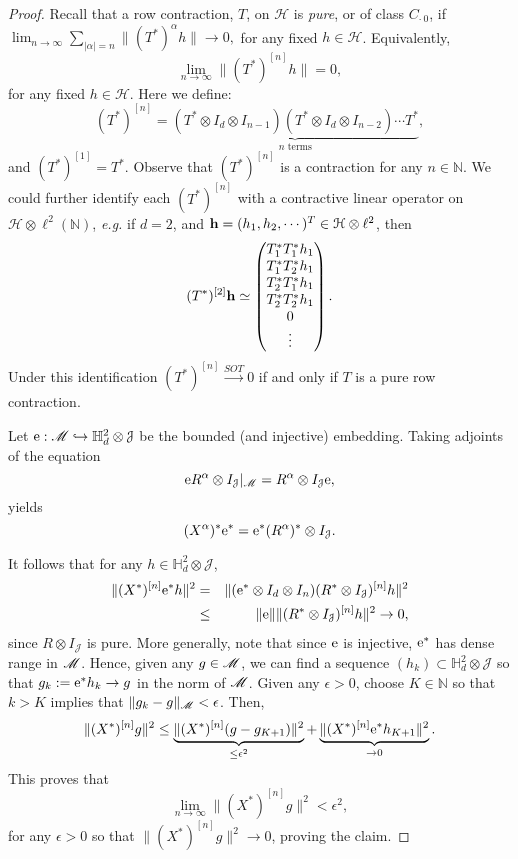 \documentclass[11pt]{article}
\newcommand{\ba}{\begin{eqnarray}}
\newcommand{\ea}{\end{eqnarray}}
\newcommand{\bpm}{\begin{pmatrix}}
\newcommand{\epm}{\end{pmatrix}}
\newcommand{\nn}{\nonumber}
\newcommand{\mr}{\ensuremath{\mathrm}}
\newcommand{\scr}{\ensuremath{\mathscr}}
\newcommand{\mbf}{\ensuremath{\mathbf}}
\newcommand{\eps}{\ensuremath{\epsilon }}
\def\N{\mathbb{N}}
\def\bH{\mathbb{H}}
\renewcommand{\H}{\ensuremath{\mathcal{H} }}
\newcommand{\J}{\ensuremath{\mathcal{J} }}
\numberwithin{equation}{section}
\numberwithin{subsection}{section}
\theoremstyle{definition}
\begin{document}
\begin{proof}
Recall that a row contraction, $T$, on $\H$ is \emph{pure}, or of class $C_{\cdot \ 0}$, if 
$ \lim _{n \rightarrow \infty} \sum _{|\alpha | = n } \| (T^* ) ^\alpha h \| \rightarrow 0, $ for any fixed $h \in \H$.
Equivalently, 
$$ \lim _{n \rightarrow \infty } \|(T^*) ^{[n]} h \| =0, $$ for any fixed $h \in \H$. Here we define:
$$ (T^*) ^{[n]} = \underbrace{(T^* \otimes I_d \otimes I_{n-1} ) (T^* \otimes I_d \otimes I_{n-2} ) \cdots T^*}_{\mbox{$n$ terms}}, $$ and $(T^*) ^{[1]} = T^*$. Observe that $(T^* ) ^{[n]}$ is a contraction for any $n \in \N$. We could further identify each $(T^* ) ^{[n]}$ with a contractive linear operator on $\H \otimes \ell ^2 (\N )$, \emph{e.g.} if $d=2$, and $\mbf{h} = ( h _1 , h_2 , \cdots ) ^T \in \H \otimes \ell ^2$, then
$$ (T^*) ^{[2]} \mbf{h} \simeq \bpm T_1 ^* T_1 ^* h _1 \\ T_1 ^* T_2 ^* h _1 \\ T_2 ^* T_1 ^* h _1 \\ T_2 ^* T_2 ^* h _1 \\ 0 \\ \vdots \epm.$$ Under this identification $(T^* ) ^{[n]} \stackrel{SOT}{\rightarrow} 0$ if and only if $T$ is a pure row contraction.

Let $\mr{e} : \scr{M} \hookrightarrow \bH ^2 _d \otimes \J$ be the bounded (and injective) embedding. Taking adjoints of 
the equation $$\mr{e} R ^\alpha \otimes I_\J | _\scr{M} = R^\alpha \otimes I_\J \mr{e}, $$ yields
$$ (X^\alpha ) ^* \mr{e} ^* = \mr{e} ^* (R^\alpha ) ^* \otimes I_\J. $$ 

It follows that for any $h \in \bH ^2 _d \otimes \J $,
\ba \| (X^*) ^{[n]} \mr{e} ^* h \| ^2 & = & \| (\mr{e} ^* \otimes I_d \otimes I_n)  (R^* \otimes I_\J ) ^{[n]} h \| ^2 \nn \\
& \leq & \| \mr{e} \| \| (R^* \otimes I_\J) ^{[n]} h \| ^2 \rightarrow 0, \nn \ea 
since $R \otimes I_\J$ is pure. More generally, note that since $\mr{e}$ is injective, $\mr{e} ^*$ has dense range in $\scr{M}$. Hence, given any $g \in \scr{M}$, we can find a sequence $(h_k) \subset \bH ^2 _d \otimes \J$ so that $g_k := \mr{e} ^* h_k \rightarrow g$ in the norm of $\scr{M}$. Given any $\eps >0$, choose $K \in \N$ so that $k> K $ implies that $\| g_k - g \| _{\scr{M}} < \eps$. Then, 
$$ \| (X^*) ^{[n]} g \| ^2  \leq  \underbrace{\| (X^*) ^{[n]} (g - g _{K+1} ) \| ^2}_{\leq \eps ^2} + \underbrace{\| (X^*) ^{[n]} \mr{e} ^* h_{K+1} \| ^2}_{\rightarrow 0}. $$ This proves that 
$$ \lim _{n\rightarrow \infty} \| (X^*) ^{[n]} g \| ^2 < \eps ^2, $$ for any $\eps >0$ so that 
$ \| (X^*) ^{[n]} g \| ^2 \rightarrow 0$, proving the claim.
\end{proof}
\end{document}

